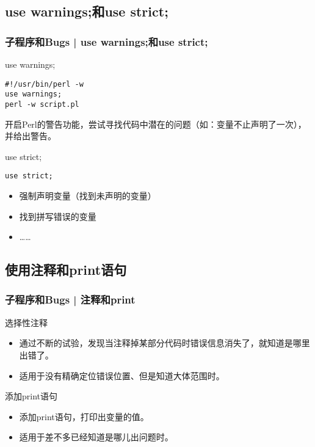 \subsection{use warnings;和use strict;}
\begin{frame}[fragile]
  \frametitle{子程序和Bugs | \alert{use warnings;和use strict;}}
  \begin{block}{use warnings;}
\begin{lstlisting}
#!/usr/bin/perl -w
use warnings;
perl -w script.pl
\end{lstlisting}
开启Perl的警告功能，尝试寻找代码中潜在的问题（如：变量不止声明了一次），并给出警告。
  \end{block}
  \pause
  \begin{block}{use strict;}
\begin{lstlisting}
use strict;
\end{lstlisting}
\begin{itemize}
  \item 强制声明变量（找到未声明的变量）
  \item 找到拼写错误的变量
  \item ……
\end{itemize}
  \end{block}
\end{frame}

\subsection{使用注释和print语句}
\begin{frame}
  \frametitle{子程序和Bugs | \alert{注释和print}}
  \begin{block}{选择性注释}
    \begin{itemize}
      \item 通过不断的试验，发现当注释掉某部分代码时错误信息消失了，就知道是哪里出错了。 
      \item 适用于没有精确定位错误位置、但是知道大体范围时。
    \end{itemize}
  \end{block}
  \pause
  \begin{block}{添加print语句}
    \begin{itemize}
      \item 添加print语句，打印出变量的值。
      \item 适用于差不多已经知道是哪儿出问题时。
    \end{itemize}
  \end{block}
\end{frame}

